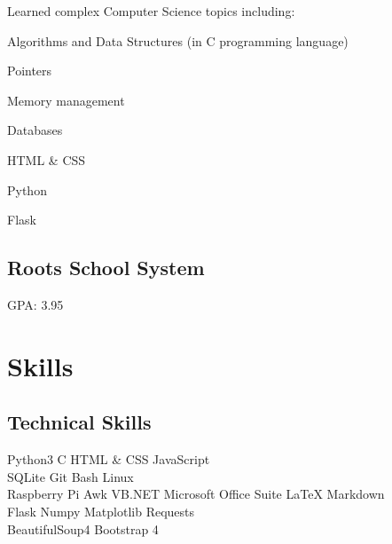 \documentclass[]{deedy-resume-openfont}
\begin{document}
\begin{minipage}[t]{0.33\textwidth}
Learned complex Computer Science topics including: \\
\begin{tightemize}
\item Algorithms and Data Structures (in C programming language)
\item Pointers
\item Memory management
\item Databases
\item HTML \& CSS
\item Python
\item Flask
\end{tightemize}
\sectionsep

\subsection{Roots School System}
GPA: 3.95
\sectionsep


\section{Skills}
\subsection{Technical Skills}
Python3 \textbullet{}   C \textbullet{} HTML \& CSS \textbullet{} JavaScript \\
SQLite \textbullet{} Git \textbullet{} Bash \textbullet{} Linux \\
Raspberry Pi \textbullet{} Awk \textbullet{} VB.NET \textbullet{} Microsoft Office Suite \textbullet{} LaTeX \textbullet{} Markdown \\

Flask \textbullet{} Numpy \textbullet{} Matplotlib \textbullet{} Requests \\ BeautifulSoup4 \textbullet{} Bootstrap 4 \\
\sectionsep


\end{minipage}
\end{document}

